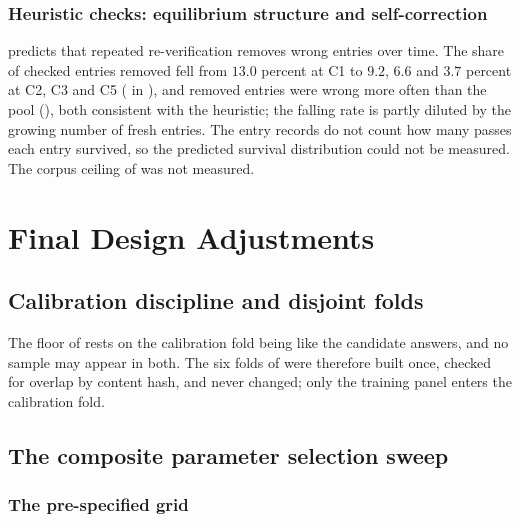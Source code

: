 \subsubsection{Heuristic checks: equilibrium structure and self-correction}
\label{sec:check-corollaries}

 predicts that repeated re-verification removes wrong entries over time. The share of checked entries removed fell from $13.0$ percent at C1 to $9.2$, $6.6$ and $3.7$ percent at C2, C3 and C5 ( in ), and removed entries were wrong more often than the pool (), both consistent with the heuristic; the falling rate is partly diluted by the growing number of fresh entries. The entry records do not count how many passes each entry survived, so the predicted survival distribution could not be measured. The corpus ceiling of  was not measured.



\FloatBarrier

\section{Final Design Adjustments}
\label{sec:final-adjustments}

\subsection{Calibration discipline and disjoint folds}
\label{sec:adj-discipline}

The floor of  rests on the calibration fold being like the candidate answers, and no sample may appear in both. The six folds of  were therefore built once, checked for overlap by content hash, and never changed; only the training panel enters the calibration fold.

\subsection{The composite parameter selection sweep}
\label{sec:adj-sweep}

\subsubsection{The pre-specified grid}
\label{sec:adj-grid}

